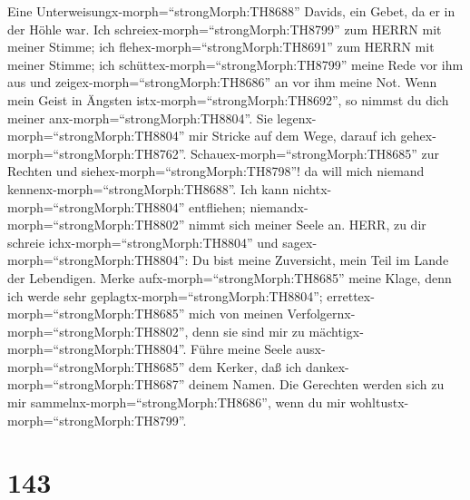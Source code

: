  Eine Unterweisungx-morph=``strongMorph:TH8688'' Davids, ein
Gebet, da er in der Höhle war. Ich schreiex-morph=``strongMorph:TH8799''
zum HERRN mit meiner Stimme; ich flehex-morph=``strongMorph:TH8691'' zum
HERRN mit meiner Stimme;  ich
schüttex-morph=``strongMorph:TH8799'' meine Rede vor ihm aus und
zeigex-morph=``strongMorph:TH8686'' an vor ihm meine Not. 
Wenn mein Geist in Ängsten istx-morph=``strongMorph:TH8692'', so nimmst
du dich meiner anx-morph=``strongMorph:TH8804''. Sie
legenx-morph=``strongMorph:TH8804'' mir Stricke auf dem Wege, darauf ich
gehex-morph=``strongMorph:TH8762''. 
Schauex-morph=``strongMorph:TH8685'' zur Rechten und
siehex-morph=``strongMorph:TH8798''! da will mich niemand
kennenx-morph=``strongMorph:TH8688''. Ich kann
nichtx-morph=``strongMorph:TH8804'' entfliehen;
niemandx-morph=``strongMorph:TH8802'' nimmt sich meiner Seele an.
 HERR, zu dir schreie ichx-morph=``strongMorph:TH8804'' und
sagex-morph=``strongMorph:TH8804'': Du bist meine Zuversicht, mein Teil
im Lande der Lebendigen.  Merke
aufx-morph=``strongMorph:TH8685'' meine Klage, denn ich werde sehr
geplagtx-morph=``strongMorph:TH8804'';
errettex-morph=``strongMorph:TH8685'' mich von meinen
Verfolgernx-morph=``strongMorph:TH8802'', denn sie sind mir zu
mächtigx-morph=``strongMorph:TH8804''.  Führe meine Seele
ausx-morph=``strongMorph:TH8685'' dem Kerker, daß ich
dankex-morph=``strongMorph:TH8687'' deinem Namen. Die Gerechten werden
sich zu mir sammelnx-morph=``strongMorph:TH8686'', wenn du mir
wohltustx-morph=``strongMorph:TH8799''.

\hypertarget{section-142}{%
\section{143}\label{section-142}}

